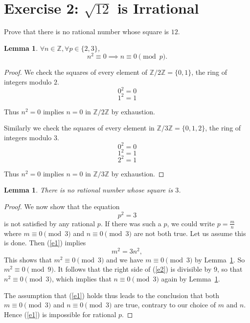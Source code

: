\documentclass{amsbook}
\newtheorem{lemma}[theorem]{Lemma}
\theoremstyle{definition}
\theoremstyle{remark}
\numberwithin{section}{chapter}
\numberwithin{equation}{chapter}
\begin{document}
\section{Exercise 2: $\sqrt{12}$ is Irrational}

Prove that there is no rational number whose square is $12$.

\begin{lemma}\label{lemma1.2}
$\forall n\in \mathbb{Z}, \forall p\in \{2, 3\}$,
\[
n^2\equiv 0 \implies n\equiv 0 \pmod p.
\]
\end{lemma}

\begin{proof}
We check the squares of every element of $\mathbb{Z}/2\mathbb{Z}=\{0,1\}$, the ring of integers modulo $2$.
\[0^2 = 0\]
\[1^2 = 1\]

Thus $n^2=0$ implies $n=0$ in $\mathbb{Z}/2\mathbb{Z}$ by exhaustion.

Similarly we check the squares of every element in $\mathbb{Z}/3\mathbb{Z}=\{0,1,2\}$, the ring of integers modulo $3$.
\[0^2 = 0\]
\[1^2 = 1\]
\[2^2 = 1\]

Thus $n^2=0$ implies $n=0$ in $\mathbb{Z}/3\mathbb{Z}$ by exhaustion.
\end{proof}

\begin{lemma}\label{l2}
There is no rational number whose square is $3$.
\end{lemma}

\begin{proof}
We now show that the equation
\begin{equation}\label{e1}
p^2=3
\end{equation}
is not satisfied by any rational $p$. If there was such a $p$, we could write $p=\frac{m}{n}$ where $m\equiv 0 \pmod{3}$ and $n\equiv 0 \pmod{3}$ are not both true. Let us assume this is done. Then (\ref{e1}) implies
\begin{equation}\label{e2}
m^2=3n^2,
\end{equation}
This shows that $m^2\equiv 0\pmod{3}$ and we have $m\equiv 0 \pmod{3}$ by Lemma~\ref{lemma1.2}. So $m^2\equiv 0\pmod{9}$. It follows that the right side of (\ref{e2}) is divisible by 9, so that $n^2\equiv 0\pmod{3}$, which implies that $n\equiv 0\pmod{3}$ again by Lemma~\ref{lemma1.2}.

The assumption that (\ref{e1}) holds thus leads to the conclusion that both $m\equiv 0 \pmod{3}$ and $n\equiv 0 \pmod{3}$ are true, contrary to our choice of $m$ and $n$. Hence (\ref{e1}) is impossible for rational $p$.
\end{proof}
\end{document}
